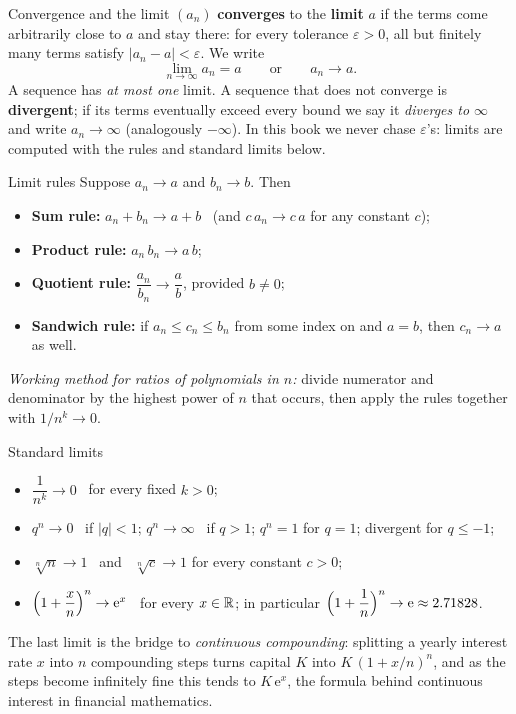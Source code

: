 \begin{rulebox}{Convergence and the limit}
$(a_{n})$ \textbf{converges} to the \textbf{limit} $a$ if the terms come arbitrarily close to $a$ and stay
there: for every tolerance $\varepsilon>0$, all but finitely many terms
satisfy $|a_{n}-a|<\varepsilon$. We write
\[
  \lim_{n\to\infty}a_{n}=a \qquad\text{or}\qquad a_{n}\to a .
\]
A sequence has \emph{at most one} limit. A sequence that does not converge
is \textbf{divergent}; if its terms eventually exceed every bound we say it
\emph{diverges to $\infty$} and write $a_{n}\to\infty$ (analogously
$-\infty$). In this book we never chase $\varepsilon$'s: limits are
computed with the rules and standard limits below.
\end{rulebox}

\begin{rulebox}{Limit rules}
Suppose $a_{n}\to a$ and $b_{n}\to b$. Then
\begin{itemize}[leftmargin=1.6em,itemsep=0.3ex]
  \item \textbf{Sum rule:} $a_{n}+b_{n}\to a+b$ \ (and $c\,a_{n}\to c\,a$
        for any constant $c$);
  \item \textbf{Product rule:} $a_{n}\,b_{n}\to a\,b$;
  \item \textbf{Quotient rule:} $\dfrac{a_{n}}{b_{n}}\to\dfrac{a}{b}$,
        provided $b\neq 0$;
  \item \textbf{Sandwich rule:} if $a_{n}\leq c_{n}\leq b_{n}$ from some
        index on and $a=b$, then $c_{n}\to a$ as well.
\end{itemize}
\emph{Working method for ratios of polynomials in $n$:} divide numerator
and denominator by the highest power of $n$ that occurs, then apply the
rules together with $1/n^{k}\to 0$.
\end{rulebox}

\begin{rulebox}{Standard limits}
\begin{itemize}[leftmargin=1.6em,itemsep=0.3ex]
  \item $\dfrac{1}{n^{k}}\to 0$ \ for every fixed $k>0$;
  \item $q^{n}\to 0$ \ if $|q|<1$; \quad $q^{n}\to\infty$ \ if $q>1$;
        \quad $q^{n}=1$ for $q=1$; \quad divergent for $q\leq -1$;
  \item $\sqrt[n]{n}\to 1$ \ and \ $\sqrt[n]{c}\to 1$ for every constant
        $c>0$;
  \item $\Bigl(1+\dfrac{x}{n}\Bigr)^{n}\to\mathrm{e}^{x}$ \ for every
        $x\in\mathbb{R}$; in particular
        $\Bigl(1+\dfrac{1}{n}\Bigr)^{n}\to\mathrm{e}\approx 2.71828$.
\end{itemize}
The last limit is the bridge to \emph{continuous compounding}: splitting a
yearly interest rate $x$ into $n$ compounding steps turns capital $K$ into
$K\,(1+x/n)^{n}$, and as the steps become infinitely fine this tends to
$K\,\mathrm{e}^{x}$, the formula behind continuous interest in financial
mathematics.
\end{rulebox}

